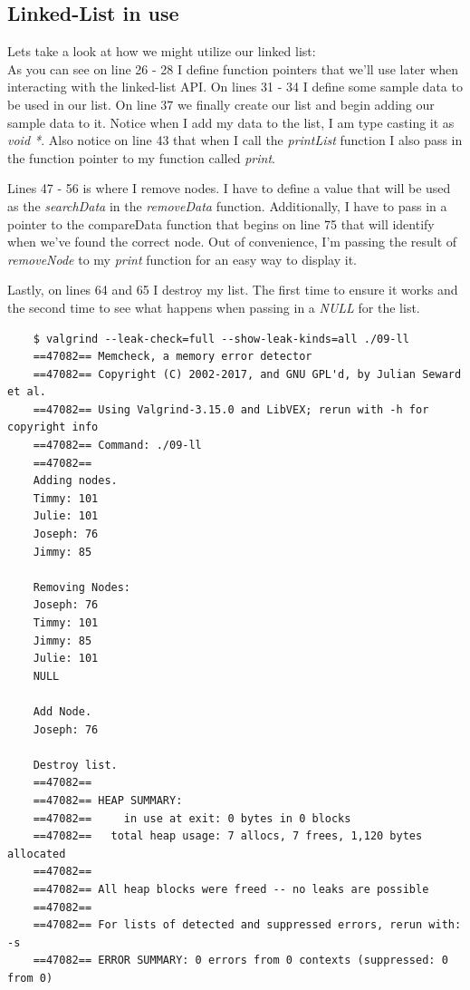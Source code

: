 \documentclass[../main.tex]{subfiles}
\begin{document}
	\subsection{Linked-List in use}
	Lets take a look at how we might utilize our linked list:\\
	
	
	
	As you can see on line 26 - 28 I define function pointers that we'll use later when interacting with the linked-list API.  On lines 31 - 34 I define some sample data to be used in our list.  On line 37 we finally create our list and begin adding our sample data to it.  Notice when I add my data to the list, I am type casting it as \textit{void *}.  Also notice on line 43 that when I call the \textit{printList} function I also pass in the function pointer to my function called \textit{print}.
	
	Lines 47 - 56 is where I remove nodes.  I have to define a value that will be used as the \textit{searchData} in the \textit{removeData} function.  Additionally, I have to pass in a pointer to the compareData function that begins on line 75 that will identify when we've found the correct node.  Out of convenience, I'm passing the result of \textit{removeNode} to my \textit{print} function for an easy way to display it.
	
	Lastly, on lines 64 and 65 I destroy my list.  The first time to ensure it works and the second time to see what happens when passing in a \textit{NULL} for the list.
	
	\begin{verbatim}
	$ valgrind --leak-check=full --show-leak-kinds=all ./09-ll 
	==47082== Memcheck, a memory error detector
	==47082== Copyright (C) 2002-2017, and GNU GPL'd, by Julian Seward et al.
	==47082== Using Valgrind-3.15.0 and LibVEX; rerun with -h for copyright info
	==47082== Command: ./09-ll
	==47082== 
	Adding nodes.
	Timmy: 101
	Julie: 101
	Joseph: 76
	Jimmy: 85
	
	Removing Nodes:
	Joseph: 76
	Timmy: 101
	Jimmy: 85
	Julie: 101
	NULL
	
	Add Node.
	Joseph: 76
	
	Destroy list.
	==47082== 
	==47082== HEAP SUMMARY:
	==47082==     in use at exit: 0 bytes in 0 blocks
	==47082==   total heap usage: 7 allocs, 7 frees, 1,120 bytes allocated
	==47082== 
	==47082== All heap blocks were freed -- no leaks are possible
	==47082== 
	==47082== For lists of detected and suppressed errors, rerun with: -s
	==47082== ERROR SUMMARY: 0 errors from 0 contexts (suppressed: 0 from 0)
	\end{verbatim}
	
\end{document}
